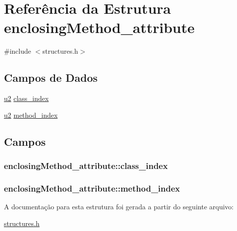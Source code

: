 \hypertarget{structenclosingMethod__attribute}{}\section{Referência da Estrutura enclosing\+Method\+\_\+attribute}
\label{structenclosingMethod__attribute}


{\ttfamily \#include $<$structures.\+h$>$}

\subsection*{Campos de Dados}
\begin{DoxyCompactItemize}
\item 
\hyperlink{lista__operandos_8h_a732cde1300aafb73b0ea6c2558a7a54f}{u2} \hyperlink{structenclosingMethod__attribute_a3f2ebf2e90b6eb973e3fc92d88307c06}{class\+\_\+index}
\item 
\hyperlink{lista__operandos_8h_a732cde1300aafb73b0ea6c2558a7a54f}{u2} \hyperlink{structenclosingMethod__attribute_a86276273eb87b21a7d0bb23daddb0bca}{method\+\_\+index}
\end{DoxyCompactItemize}


\subsection{Campos}
\subsubsection[{\texorpdfstring{class\+\_\+index}{class_index}}]{ enclosing\+Method\+\_\+attribute\+::class\+\_\+index}\hypertarget{structenclosingMethod__attribute_a3f2ebf2e90b6eb973e3fc92d88307c06}{}\label{structenclosingMethod__attribute_a3f2ebf2e90b6eb973e3fc92d88307c06}
\subsubsection[{\texorpdfstring{method\+\_\+index}{method_index}}]{ enclosing\+Method\+\_\+attribute\+::method\+\_\+index}\hypertarget{structenclosingMethod__attribute_a86276273eb87b21a7d0bb23daddb0bca}{}\label{structenclosingMethod__attribute_a86276273eb87b21a7d0bb23daddb0bca}


A documentação para esta estrutura foi gerada a partir do seguinte arquivo\+:\begin{DoxyCompactItemize}
\item 
\hyperlink{structures_8h}{structures.\+h}\end{DoxyCompactItemize}
